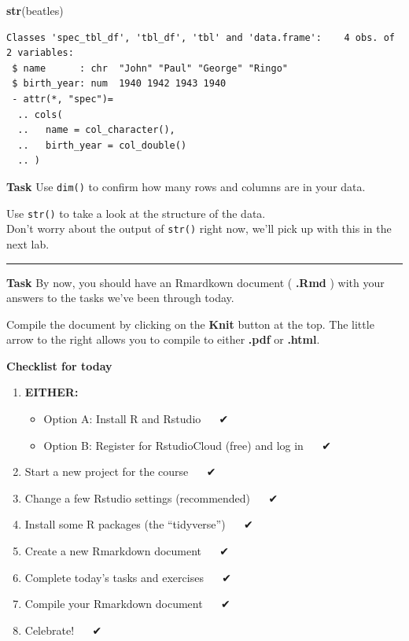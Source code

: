 \documentclass[]{book}
\newenvironment{Shaded}{\begin{snugshade}}{\end{snugshade}}
\newcommand{\KeywordTok}[1]{\textcolor[rgb]{0.13,0.29,0.53}{\textbf{#1}}}
\newcommand{\NormalTok}[1]{#1}
\providecommand{\tightlist}{%
  \setlength{\itemsep}{0pt}\setlength{\parskip}{0pt}}
\begin{document}
\begin{Shaded}
\begin{Highlighting}[]
\KeywordTok{str}\NormalTok{(beatles)}
\end{Highlighting}
\end{Shaded}

\begin{verbatim}
Classes 'spec_tbl_df', 'tbl_df', 'tbl' and 'data.frame':    4 obs. of  2 variables:
 $ name      : chr  "John" "Paul" "George" "Ringo"
 $ birth_year: num  1940 1942 1943 1940
 - attr(*, "spec")=
  .. cols(
  ..   name = col_character(),
  ..   birth_year = col_double()
  .. )
\end{verbatim}

\textbf{Task}
Use \texttt{dim()} to confirm how many rows and columns are in your data.

Use \texttt{str()} to take a look at the structure of the data.\\
Don't worry about the output of \texttt{str()} right now, we'll pick up with this in the next lab.

\begin{center}\rule{0.5\linewidth}{0.5pt}\end{center}

\textbf{Task}
By now, you should have an Rmardkown document ( \textbf{.Rmd} ) with your answers to the tasks we've been through today.

Compile the document by clicking on the \textbf{Knit} button at the top. The little arrow to the right allows you to compile to either \textbf{.pdf} or \textbf{.html}.

\textbf{Checklist for today}

\begin{enumerate}
\def\labelenumi{\arabic{enumi}.}
\tightlist
\item
  \textbf{EITHER:}

  \begin{itemize}
  \tightlist
  \item
    Option A: Install R and Rstudio   ✔
  \item
    Option B: Register for RstudioCloud (free) and log in   ✔
  \end{itemize}
\item
  Start a new project for the course   ✔
\item
  Change a few Rstudio settings (recommended)   ✔
\item
  Install some R packages (the ``tidyverse'')   ✔
\item
  Create a new Rmarkdown document   ✔
\item
  Complete today's tasks and exercises   ✔
\item
  Compile your Rmarkdown document   ✔
\item
  Celebrate!   ✔ 🎉
\end{enumerate}
\end{document}

